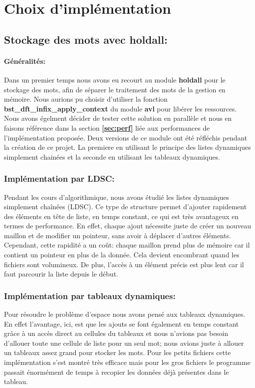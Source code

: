 \documentclass{article}
\begin{document}
\section{Choix d'implémentation}

\subsection{Stockage des mots avec holdall:}
\paragraph{Généralités:}
Dans un premier temps nous avons eu recourt au module \textbf{holdall} pour le stockage des mots, 
afin de séparer le traitement des mots de la gestion en mémoire. Nous aurions pu choisir d'utiliser la fonction
\textbf{bst\_dft\_infix\_apply\_context} du module \textbf{avl} pour libérer les ressources.
Nous avons égelment décider de tester cette solution en parallèle et nous en faisons référence dans
la section \textbf{\ref{sec:perf}} liée aux performances de l'implémentation proposée.
Deux versions de ce module ont été réfléchis pendant la création de ce projet. La premiere en utilisant le 
principe des listes dynamiques simplement chainées et la seconde en utilisant les tableaux dynamiques.
\subsubsection{Implémentation par LDSC:}\label{subsec:impl}
Pendant les cours d'algorithmique, nous avons étudié les listes dynamiques simplement chaînées (LDSC).
Ce type de structure permet d'ajouter rapidement des éléments en tête de liste, en temps constant,
ce qui est très avantageux en termes de performance. En effet, chaque ajout nécessite juste de créer
un nouveau maillon et de modifier un pointeur, sans avoir à déplacer d'autres éléments. 
Cependant, cette rapidité a un coût: chaque maillon prend plus de mémoire car il contient un pointeur en 
plus de la donnée. Cela devient encombrant quand les fichiers sont volumineux. De plus, l'accès à un élément précis 
est plus lent car il faut parcourir la liste depuis le début.
\subsubsection{Implémentation par tableaux dynamiques:}
Pour résoudre le problème d'espace nous avons pensé aux tableaux dynamiques. En effet l'avantage, ici,
est que les ajouts se font également en temps constant grâce à un accès direct au cellules du tableaux et nous n'avions
pas besoin d'allouer toute une cellule de liste pour un seul mot; nous avions juste à allouer un tableaux assez grand pour
stocker les mots. Pour les petits fichiers cette implémentation s'est montré très efficace mais pour les gros fichiers
le programme passait énormément de temps à recopier les données déjà présentes dans le tableau.
\end{document}

